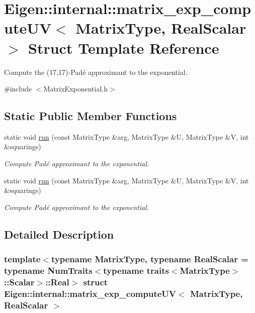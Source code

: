 \hypertarget{struct_eigen_1_1internal_1_1matrix__exp__compute_u_v}{}\section{Eigen\+:\+:internal\+:\+:matrix\+\_\+exp\+\_\+compute\+UV$<$ Matrix\+Type, Real\+Scalar $>$ Struct Template Reference}
\label{struct_eigen_1_1internal_1_1matrix__exp__compute_u_v}


Compute the (17,17)-\/\+Pad\'{e} approximant to the exponential.  




{\ttfamily \#include $<$Matrix\+Exponential.\+h$>$}

\subsection*{Static Public Member Functions}
\begin{DoxyCompactItemize}
\item 
static void \hyperlink{struct_eigen_1_1internal_1_1matrix__exp__compute_u_v_a7847531ae0fccc8ec7648f95846c8adb}{run} (const Matrix\+Type \&arg, Matrix\+Type \&U, Matrix\+Type \&V, int \&squarings)
\begin{DoxyCompactList}\small\item\em Compute Pad\'{e} approximant to the exponential. \end{DoxyCompactList}\item 
static void \hyperlink{struct_eigen_1_1internal_1_1matrix__exp__compute_u_v_a7847531ae0fccc8ec7648f95846c8adb}{run} (const Matrix\+Type \&arg, Matrix\+Type \&U, Matrix\+Type \&V, int \&squarings)
\begin{DoxyCompactList}\small\item\em Compute Pad\'{e} approximant to the exponential. \end{DoxyCompactList}\end{DoxyCompactItemize}


\subsection{Detailed Description}
\subsubsection*{template$<$typename Matrix\+Type, typename Real\+Scalar = typename Num\+Traits$<$typename traits$<$\+Matrix\+Type$>$\+::\+Scalar$>$\+::\+Real$>$\newline
struct Eigen\+::internal\+::matrix\+\_\+exp\+\_\+compute\+U\+V$<$ Matrix\+Type, Real\+Scalar $>$}

